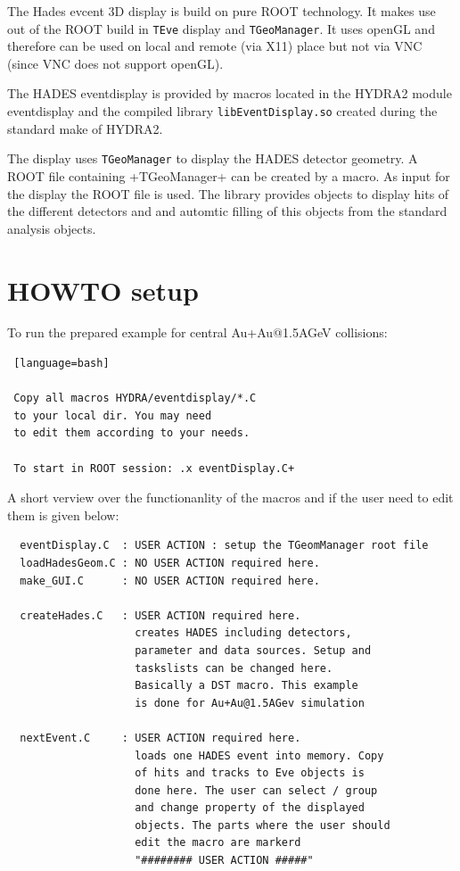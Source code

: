 The Hades evcent 3D display is build on pure ROOT technology.
It makes use out of the ROOT build in \verb+TEve+ display and 
\verb+TGeoManager+.
It uses openGL and therefore can be used on local and remote 
(via X11) place but not via VNC (since VNC does not support openGL).

The HADES eventdisplay is provided by macros located in
the HYDRA2 module eventdisplay and the compiled library
\verb+libEventDisplay.so+ created during the standard 
make of HYDRA2.

The display uses \verb+TGeoManager+ to display the HADES detector
geometry. A ROOT file containing +TGeoManager+ can be created
by a macro. As input for the display the ROOT file is used.
The library provides objects to display hits of the different
detectors and and automtic filling of this objects from
the standard analysis objects.


\section{HOWTO setup}

To run the prepared example for central Au+Au@1.5AGeV collisions: 
\begin{lstlisting} [language=bash]

 Copy all macros HYDRA/eventdisplay/*.C 
 to your local dir. You may need
 to edit them according to your needs.

 To start in ROOT session: .x eventDisplay.C+
\end{lstlisting}

A short verview over the functionanlity of the macros and
if the user need to edit them is given below:

\begin{lstlisting}
  eventDisplay.C  : USER ACTION : setup the TGeomManager root file
  loadHadesGeom.C : NO USER ACTION required here.
  make_GUI.C      : NO USER ACTION required here.

  createHades.C   : USER ACTION required here.
                    creates HADES including detectors,
                    parameter and data sources. Setup and
                    taskslists can be changed here.
                    Basically a DST macro. This example
                    is done for Au+Au@1.5AGev simulation

  nextEvent.C     : USER ACTION required here.
                    loads one HADES event into memory. Copy
                    of hits and tracks to Eve objects is
                    done here. The user can select / group
                    and change property of the displayed
                    objects. The parts where the user should
                    edit the macro are markerd
                    "######## USER ACTION #####"
\end{lstlisting}



